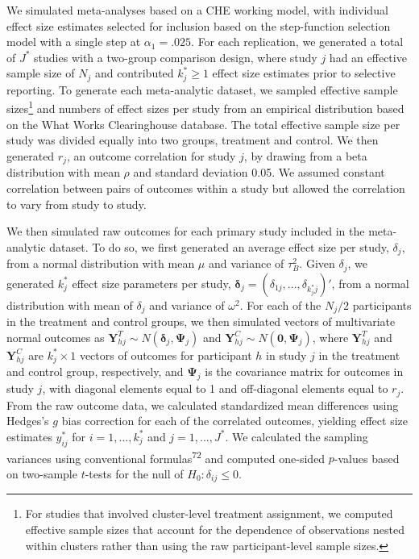 \documentclass[
  american,
  man, donotrepeattitle,floatsintext]{apa7}
\begin{document}
We simulated meta-analyses based on a CHE working model, with individual effect size estimates selected
for inclusion based on the step-function selection model with a single step at \(\alpha_1 = .025\).
For each replication, we generated a total of \(J^*\) studies with a two-group comparison
design, where study \(j\) had an effective sample size of \(N_j\) and contributed \(k_j^* \geq 1\) effect size estimates prior to selective reporting.
To generate each meta-analytic dataset, we sampled effective sample sizes\footnote{For studies that involved cluster-level treatment assignment, we computed effective sample sizes that account for the dependence of observations nested within clusters rather than using the raw participant-level sample sizes.} and numbers of effect sizes per study from an empirical distribution based on the What Works Clearinghouse database.
The total effective sample size per study was divided equally into two groups, treatment and control.
We then generated \(r_j\), an outcome correlation for study \(j\), by drawing from a beta distribution with mean \(\rho\) and standard deviation 0.05.
We assumed constant correlation between pairs of outcomes within a study but allowed the correlation to vary from study to study.

We then simulated raw outcomes for each primary study included in the
meta-analytic dataset. To do so, we first generated an average effect
size per study, \(\delta_j\), from a normal distribution with mean \(\mu\) and variance
of \(\tau_B^2\). Given \(\delta_j\), we generated \(k_j^*\) effect size parameters per study, \(\boldsymbol\delta_j = \left(\delta_{1j},...,\delta_{k_j^* j}\right)'\), from a normal distribution with mean of \(\delta_j\) and
variance of \(\omega^2\).
For each of the \(N_j / 2\) participants in the treatment and control groups, we then simulated vectors of multivariate normal outcomes as \(\mathbf{Y}_{hj}^T \sim N(\boldsymbol\delta_j, \boldsymbol\Psi_j)\) and \(\mathbf{Y}_{hj}^C \sim N(\mathbf{0}, \boldsymbol\Psi_j)\), where \(\mathbf{Y}_{hj}^T\) and \(\mathbf{Y}_{hj}^C\) are
\(k_j^* \times 1\) vectors of outcomes for participant \(h\) in study \(j\) in the treatment and control group, respectively, and \(\boldsymbol\Psi_j\) is the covariance matrix for outcomes in study \(j\), with diagonal elements equal to 1 and off-diagonal elements equal to \(r_j\).
From the raw outcome data, we calculated standardized mean
differences using Hedges's \(g\) bias correction for each of the correlated outcomes, yielding effect size estimates \(y^*_{ij}\) for \(i=1,...,k_j^*\) and \(j = 1,...,J^*\).
We calculated the sampling variances using conventional formulas\textsuperscript{72} and computed one-sided \(p\)-values based on two-sample \(t\)-tests for the null of \(H_0: \delta_{ij} \leq 0\).
\end{document}
